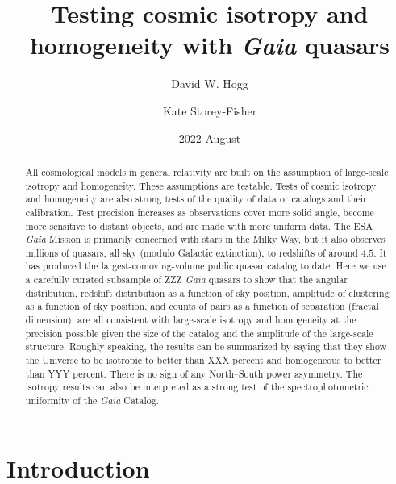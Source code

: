 \documentclass[modern]{aastex631}
\begin{document}
\title{%
Testing cosmic isotropy and homogeneity
with \textsl{Gaia} quasars}
\author[0000-0003-2866-9403]{David W. Hogg}

\author[0000-0001-8764-7103]{Kate Storey-Fisher}

\date{2022 August}

\begin{abstract}\noindent
All cosmological models in general relativity are built on the assumption of large-scale isotropy and homogeneity.
These assumptions are testable.
Tests of cosmic isotropy and homogeneity are also strong tests of the quality of data or catalogs and their calibration.
Test precision increases as observations cover more solid angle, become more sensitive to distant objects, and are made with more uniform data.
The ESA \textsl{Gaia} Mission is primarily concerned with stars in the Milky Way, but it also observes millions of quasars, all sky (modulo Galactic extinction), to redshifts of around $4.5$.
It has produced the largest-comoving-volume public quasar catalog to date.
Here we use a carefully curated subsample of ZZZ \textsl{Gaia} quasars to show that the angular distribution, redshift distribution as a function of sky position, amplitude of clustering as a function of sky position, and counts of pairs as a function of separation (fractal dimension), are all consistent with large-scale isotropy and homogeneity at the precision possible given the size of the catalog and the amplitude of the large-scale structure.
Roughly speaking, the results can be summarized by saying that they show the Universe to be isotropic to better than XXX percent and homogeneous to better than YYY percent.
There is no sign of any North--South power asymmetry.
The isotropy results can also be interpreted as a strong test of the spectrophotometric uniformity of the \textsl{Gaia} Catalog.
\end{abstract}

\section*{}
\clearpage
\section{Introduction}\label{sec:intro}
\end{document}

